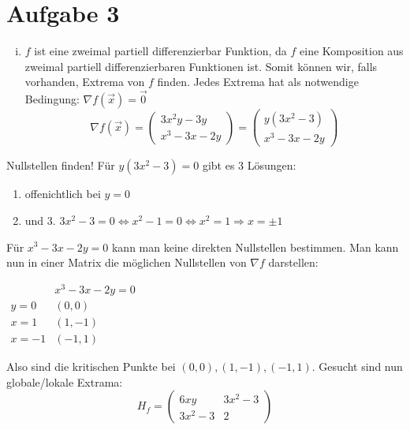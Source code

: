 \documentclass[10pt,a4paper,parskip=half]{scrartcl}
\begin{document}
\section*{Aufgabe 3}
\begin{enumerate}[(i)]
	\item 	\(f\) ist eine zweimal partiell differenzierbar Funktion, da \(f\) eine Komposition aus zweimal partiell differenzierbaren Funktionen ist. Somit können wir, falls vorhanden, Extrema von $f$ finden. Jedes Extrema hat als notwendige Bedingung: $\nabla f(\vec x) = \vec 0$
	\[ \nabla f (\vec x) = 
	\begin{pmatrix}
		3x^2y - 3y \\
		x^3 - 3x - 2y 
	\end{pmatrix} =  
	\begin{pmatrix}
		y(3x^2 - 3) \\
		x^3 - 3x - 2y 
	\end{pmatrix}  \]
\end{enumerate}
Nullstellen finden!
Für \( y(3x^2 -3) = 0 \) gibt es 3 Lösungen:
\begin{enumerate}
	\item offenichtlich bei $y = 0$
	\item  und 3. \(3x^2 - 3 = 0 \Leftrightarrow x^2 - 1 = 0 \Leftrightarrow x^2 = 1 \Rightarrow x = \pm 1\)
\end{enumerate}
Für \( x^3 - 3x - 2y  = 0 \) kann man keine direkten Nullstellen bestimmen.
Man kann nun in einer Matrix die möglichen Nullstellen von $\nabla f$ darstellen: \\
\begin{center}
\begin{math}
	\begin{array}{c|cc}
	 & x^3 - 3x - 2y  = 0  \\
	 \hline
	 y = 0 & (0,0)\\
	 x = 1 & (1,-1)\\
	 x = -1 & (-1,1)
	\end{array}
\end{math}
\end{center}
Also sind die kritischen Punkte bei $(0,0), (1,-1),(-1,1)$. Gesucht sind nun globale/lokale Extrama:
	\[H_f = 
	\begin{pmatrix}
		6xy & 3x^2 - 3 \\
		3x^2 - 3 & 2	
	\end{pmatrix} \]
\end{document}
